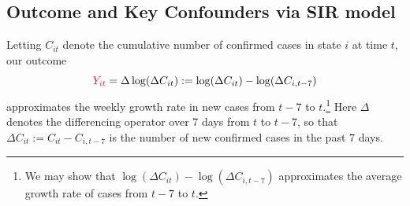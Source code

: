 \documentclass[11pt,reqno,letter]{amsart}
\theoremstyle{definition}
\def\ycolor{\color{red}}
\begin{document}
%

\subsection{Outcome and Key Confounders via SIR model}\label{sec:sirmodel}
Letting $C_{it}$ denote the cumulative number of  confirmed cases in state $i$ at time $t$, our outcome
\begin{equation} \label{eq:y}
{\ycolor Y_{it}} =\Delta \log(\Delta C_{it}):= \log( \Delta C_{it} ) -
\log( \Delta C_{i,t-7})
\end{equation}
approximates the weekly growth rate in new cases from $t-7$ to $t$.\footnote{We may show that $ \log( \Delta C_{it} ) -
\log( \Delta C_{i,t-7})$ approximates the average
growth rate of cases from $t-7$ to $t$.} Here $\Delta$ denotes the differencing operator over 7 days from $t$ to $t-7$, so that $\Delta C_{it}:=C_{it}-C_{i,t-7}$ is the number of new confirmed cases in the past 7 days.
\end{document}
